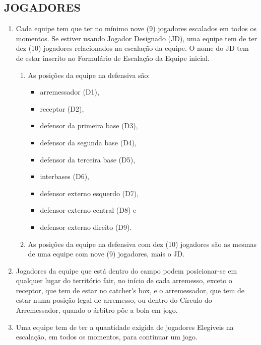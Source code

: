 \begin{multicols}{2}
	\subsection{JOGADORES} 
	
	\begin{enumerate}[label=\alph*)]
		\item Cada equipe tem que ter no m\'inimo nove (9) jogadores escalados em todos os momentos. Se estiver usando Jogador Designado (JD), uma equipe tem de ter dez (10) jogadores relacionados na escala\c{c}\~ao da equipe. O nome do JD tem de estar inscrito no Formul\'ario de Escala\c{c}\~ao da Equipe inicial. 
		
		\begin{enumerate}[label=\roman* -]
			\item As posi\c{c}\~oes da equipe na defensiva s\~ao:
			\begin{itemize}\small
				\item  arremessador (D1), 
				\item  receptor (D2), 
				\item defensor da primeira base (D3), 
				\item defensor da segunda base (D4), 
				\item defensor da terceira base (D5), 
				\item interbases (D6), 
				\item defensor externo esquerdo (D7), 
				\item defensor externo central (D8) e 
				\item defensor externo direito (D9).
			\end{itemize} 
			\item As posi\c{c}\~oes da equipe na defensiva com dez (10) jogadores s\~ao as mesmas de uma equipe com nove (9) jogadores, mais o JD. 
		\end{enumerate}
		\item  Jogadores da equipe que est\'a dentro do campo podem posicionar-se em qualquer lugar do territ\'orio \gls{fair}, no in\'icio de cada arremesso, exceto o receptor, que tem de estar no \gls{catcher's box}, e o arremessador, que tem de estar numa posi\c{c}\~ao legal de arremesso, ou dentro do C\'irculo do Arremessador, quando o \'arbitro p\~oe a bola em jogo. 
		
		\item  Uma equipe tem de ter a quantidade exigida de jogadores Eleg\'iveis na escala\c{c}\~ao, em todos os momentos, para continuar um jogo. 
	\end{enumerate}
	

\end{multicols}
